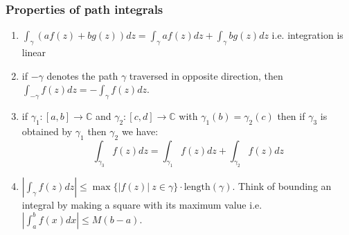 \documentclass[a4paper, 11pt]{article}
\begin{document}
\subsubsection*{Properties of path integrals} 
	\begin{enumerate}
		\item $\int_\gamma (af(z)+bg(z))dz = \int_\gamma af(z)dz + \int_\gamma bg(z)dz$ i.e. integration is linear
		
		\item if $-\gamma$ denotes the path $\gamma$ traversed in opposite direction, then $\int_{-\gamma}f(z)dz = -\int_\gamma f(z)dz$. 
		
		\item if $\gamma_1:[a,b]\rightarrow \mathbb{C}$ and $\gamma_2:[c,d]\rightarrow\mathbb{C}$ with $\gamma_1(b) = \gamma_2(c)$ then if $\gamma_3$ is obtained by $\gamma_1$ then $\gamma_2$ we have:
			\begin{equation*}
				\int_{\gamma_3}f(z)dz = \int_{\gamma_1}f(z)dz + \int_{\gamma_2}f(z)dz
			\end{equation*}
		
		\item $|\int_\gamma f(z)dz| \leq \max\{|f(z)|\:z\in\gamma\}\cdot\text{length}(\gamma)$. Think of bounding an integral by making a square with its maximum value i.e. $|\int_a^b f(x)dx|\leq M(b-a)$. 
	\end{enumerate}
	
\end{document}
